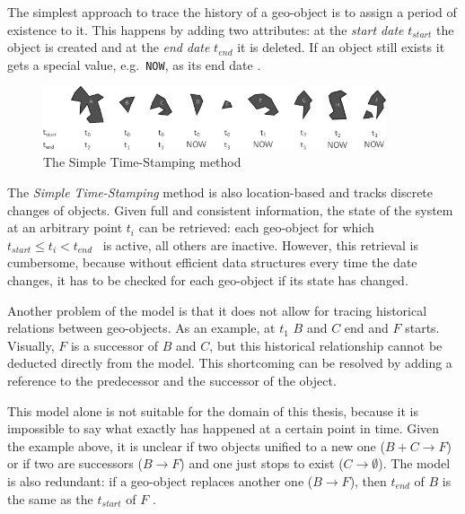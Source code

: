 The simplest approach to trace the history of a geo-object is to assign a period of existence to it. This happens by adding two attributes: at the \emph{start date} $t_{start}$ the object is created and at the \emph{end date} $t_{end}$ it is deleted. If an object still exists it gets a special value, e.g.\ \texttt{NOW}, as its end date
\cite{hunter90timestamping}.

\begin{figure}[H]
  \vspace{1em}
  \centering
  \includegraphics[width=0.9\textwidth]{graphics/basics/stdm/simple_time_stamping}
  \caption{The Simple Time-Stamping method \cite{hunter90timestamping}}
  \label{fig:simple_time_stamping}
\end{figure}

The \emph{Simple Time-Stamping} method is also location-based and tracks discrete changes of objects. Given full and consistent information, the state of the system at an arbitrary point $t_i$ can be retrieved: each geo-object for which ~$t_{start} \leq t_i < t_{end}$~ is active, all others are inactive. However, this retrieval is cumbersome, because without efficient data structures every time the date changes, it has to be checked for each geo-object if its state has changed.

Another problem of the model is that it does not allow for tracing historical relations between geo-objects. As an example, at $t_1$ $B$ and $C$ end and $F$ starts. Visually, $F$ is a successor of $B$ and $C$, but this historical relationship cannot be deducted directly from the model. This shortcoming can be resolved by adding a reference to the predecessor and the successor of the object.

This model alone is not suitable for the domain of this thesis, because it is impossible to say what exactly has happened at a certain point in time. Given the example above, it is unclear if two objects unified to a new one ($B+C \to F$) or if two are successors ($B \to F$) and one just stops to exist ($C \to \emptyset$). The model is also redundant: if a geo-object replaces another one ($B \to F$), then $t_{end}$ of $B$ is the same as the $t_{start}$ of $F$
\cite[p. 46-47]{solana2014spatio}.



